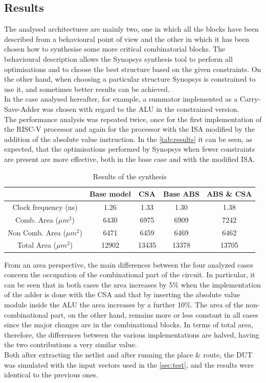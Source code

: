 \subsection{Results}
The analysed architectures are mainly two, one in which all the blocks have been described from a behavioural point of view and the other in which it has been chosen how to synthesise some more critical combinatorial blocks. The behavioural description allows the Synopsys synthesis tool to perform all optimisations and to choose the best structure based on the given constraints. On the other hand, when choosing a particular structure Synopsys is constrained to use it, and sometimes better results can be achieved.\\
In the case analysed hereafter, for example, a summator implemented as a Carry-Save-Adder was chosen with regard to the ALU in the constrained version.\\
The performance analysis was repeated twice, once for the first implementation of the RISC-V processor and again for the processor with the ISA modified by the addition of the absolute value instruction. In the \autoref{tab:results} it can be seen, as expected, that the optimisations performed by Synopsys when fewer constraints are present are more effective, both in the base case and with the modified ISA.\\
\begin{table}[H]
	\centering
	\begin{tabular}{c|c|c||c|c}
		& Base model & CSA & Base ABS & ABS  \& CSA \\
		\hline
		Clock frequency (ns) & 1.26 & 1.33 & 1.30 & 1.38 \\
		Comb. Area ($\mu m^2$) & 6430 & 6975 & 6909 & 7242 \\
		Non Comb. Area ($\mu m^2$) & 6471 & 6459 & 6469 & 6462 \\
		Total Area ($\mu m^2$)	& 12902 & 13435 & 13378 & 13705 \\
	\end{tabular}
	\caption{Results of the synthesis}
	\label{tab:results}
\end{table}

\noindent From an area perspective, the main differences between the four analyzed cases concern the occupation of the combinational part of the circuit. In particular, it can be seen that in both cases the area increases by 5\% when the implementation of the adder is done with the CSA and that by inserting the absolute value module inside the ALU the area increases by a further 10\%.
The area of the non-combinational part, on the other hand, remains more or less constant in all cases since the major changes are in the combinational blocks. In terms of total area, therefore, the differences between the various implementations are halved, having the two contributions a very similar value.\\
Both after extracting the netlist and after running the place \& route, the DUT was simulated with the input vectors used in the \autoref{sec:test}, and the results were identical to the previous ones. 

